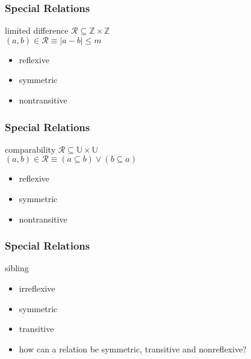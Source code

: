 \documentclass[dvipsnames]{beamer}
\begin{document}
\begin{frame}
  \frametitle{Special Relations}

  \begin{block}{limited difference}
    $\mathcal{R} \subseteq \mathbb{Z} \times \mathbb{Z}$\\
    $(a,b) \in \mathcal{R} \equiv |a-b| \leq m$

    \medskip
    \begin{itemize}
      \item reflexive
      \item symmetric
      \item nontransitive
    \end{itemize}
  \end{block}
\end{frame}

\begin{frame}
  \frametitle{Special Relations}

  \begin{block}{comparability}
    $\mathcal{R} \subseteq \mathbb{U} \times \mathbb{U}$\\
    $(a,b) \in \mathcal{R} \equiv (a \subseteq b) \vee (b \subseteq a)$

    \medskip
    \begin{itemize}
      \item reflexive
      \item symmetric
      \item nontransitive
    \end{itemize}
  \end{block}
\end{frame}

\begin{frame}
  \frametitle{Special Relations}

  \begin{block}{sibling}
    \begin{itemize}
      \item irreflexive
      \item symmetric
      \item transitive
    \end{itemize}

    \pause
    \medskip
    \begin{itemize}
      \item how can a relation be symmetric, transitive and nonreflexive?
    \end{itemize}
  \end{block}
\end{frame}
\end{document}
